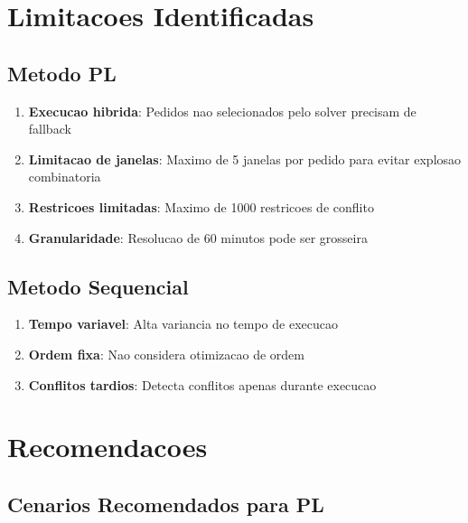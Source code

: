\documentclass[12pt,a4paper]{article}
\begin{document}
\section{Limitacoes Identificadas}

\subsection{Metodo PL}

\begin{enumerate}
    \item \textbf{Execucao hibrida}: Pedidos nao selecionados pelo solver precisam de fallback
    \item \textbf{Limitacao de janelas}: Maximo de 5 janelas por pedido para evitar explosao combinatoria
    \item \textbf{Restricoes limitadas}: Maximo de 1000 restricoes de conflito
    \item \textbf{Granularidade}: Resolucao de 60 minutos pode ser grosseira
\end{enumerate}

\subsection{Metodo Sequencial}

\begin{enumerate}
    \item \textbf{Tempo variavel}: Alta variancia no tempo de execucao
    \item \textbf{Ordem fixa}: Nao considera otimizacao de ordem
    \item \textbf{Conflitos tardios}: Detecta conflitos apenas durante execucao
\end{enumerate}

\section{Recomendacoes}

\subsection{Cenarios Recomendados para PL}
\end{document}
